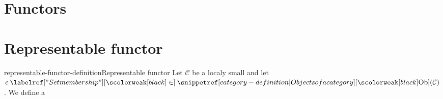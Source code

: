 \documentclass[preview]{standalone}
\begin{document}
\genpage

\section{Functors}

\section{Representable functor}

\begin{snippetdefinition}{representable-functor-definition}{Representable functor}
    Let \(\mathcal{C}\) be a localy small \category and let \(c\in\catob(\mathcal{C})\).
    We define a \todo
\end{snippetdefinition}

\end{document}
